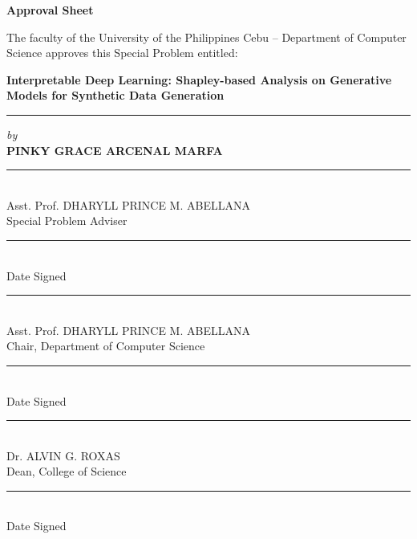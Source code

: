 \documentclass[11pt]{article}
\begin{document}
\begin{titlepage}
\begin{center}
    \Large\textbf{Approval Sheet}
\end{center}
\vspace{1em}

The faculty of the University of the Philippines Cebu -- Department of Computer Science approves this Special Problem entitled:

\begin{center}
    \vspace{3em}
    \textbf{Interpretable Deep Learning: Shapley-based Analysis on Generative Models for Synthetic Data Generation}\\
    \vspace{3em}
    \rule{\textwidth}{0.7pt} %
    
    \vspace{3em}
    \textit{by}\\
    \textbf{PINKY GRACE ARCENAL MARFA}
\end{center}

\vfill

\noindent
\begin{minipage}[t]{0.65\textwidth}
    \centering
    \rule{8.5cm}{0.4pt}\\
    Asst. Prof. DHARYLL PRINCE M. ABELLANA \\
    Special Problem Adviser
\end{minipage}
\hfill
\begin{minipage}[t]{0.3\textwidth}
    \centering
    \rule{3cm}{0.4pt} \\
    Date Signed
\end{minipage}

\vfill

\noindent
\begin{minipage}[t]{0.65\textwidth}
    \centering
    \rule{8.5cm}{0.4pt} \\
    Asst. Prof. DHARYLL PRINCE M. ABELLANA \\
    Chair, Department of Computer Science
\end{minipage}
\hfill
\begin{minipage}[t]{0.3\textwidth}
    \centering
    \rule{3cm}{0.4pt} \\
    Date Signed
\end{minipage}

\vfill

\noindent
\begin{minipage}[t]{0.65\textwidth}
    \centering
    \rule{8.5cm}{0.4pt} \\
    Dr. ALVIN G. ROXAS \\
    Dean, College of Science
\end{minipage}
\hfill
\begin{minipage}[t]{0.3\textwidth}
    \centering
    \rule{3cm}{0.4pt} \\
    Date Signed
\end{minipage}
\end{titlepage}
\end{document}
